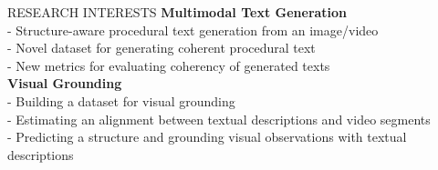 \begin{rSection}{RESEARCH INTERESTS}
{\bf Multimodal Text Generation}
\\
- Structure-aware procedural text generation from an image/video \\
- Novel dataset for generating coherent procedural text \\
- New metrics for evaluating coherency of generated texts \\
{\bf Visual Grounding}
\\
- Building a dataset for visual grounding \\
- Estimating an alignment between textual descriptions and video segments \\
- Predicting a structure and grounding visual observations with textual descriptions
\end{rSection}